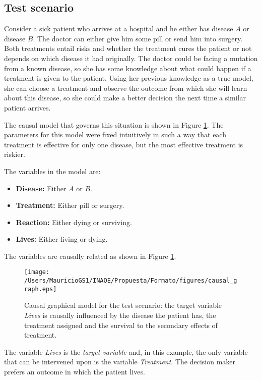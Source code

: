 \documentclass[english,letterpaper,12pt,final]{article}
\theoremstyle{definition}
\begin{document}
\subsection{Test scenario}
Consider a sick patient who arrives at a hospital and he either has disease $A$ or disease $B$. The doctor can either give him some pill or send him into surgery.  Both treatments entail risks and whether the treatment cures the patient or not depends on which disease it had originally. The doctor could be facing a mutation from a known disease, so she has some knowledge about what could happen if a treatment is given to the patient. Using her previous knowledge as a true model, she can choose a treatment and observe the outcome from which she will learn about this disease, so she could make a better decision the next time a similar patient arrives.

The causal model that governs this situation is shown in Figure \ref{causal_model}. The parameters for this model were fixed intuitively in such a way that each treatment is effective for only one disease, but the most effective treatment is riskier.

The variables in the model are: 
\begin{itemize}
\item \textbf{Disease:} Either $A$ or $B$.
\item \textbf{Treatment:} Either pill or surgery.
\item \textbf{Reaction:} Either dying or surviving.
\item \textbf{Lives:} Either living or dying.
\end{itemize}

The variables are causally related as shown in Figure \ref{causal_model}.

\begin{figure}[ht]
\vskip 0.2in
\begin{center}
\centerline{\texttt{[image: /Users/MauricioGS1/INAOE/Propuesta/Formato/figures/causal\_graph.eps]}}
\caption{Causal graphical model for the test scenario: the target variable \textit{Lives} is causally influenced by the disease the patient has, the treatment assigned and the survival to the secondary effects of treatment.}
\label{causal_model}
\end{center}
\vskip -0.2in
\end{figure}

The variable \textit{Lives} is the \textit{target variable} and, in this example, the only variable that can be intervened upon is the variable \textit{Treatment}. The decision maker prefers an outcome in which the patient lives.
\end{document}
